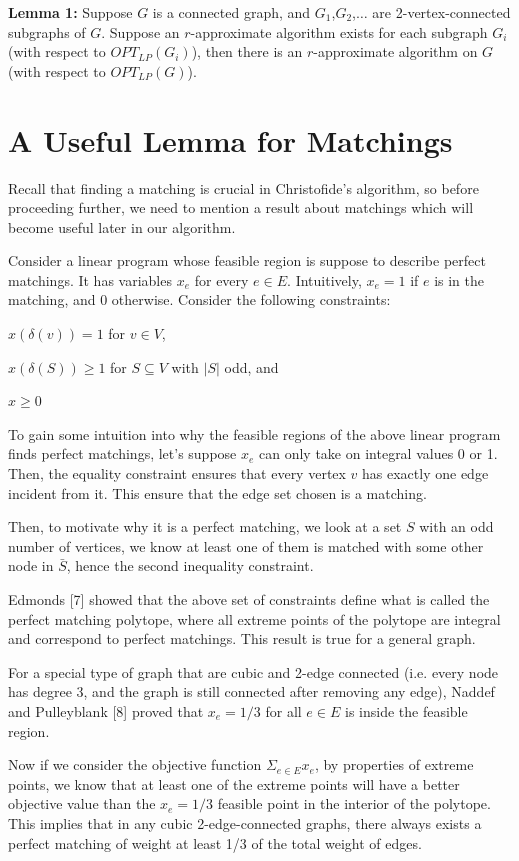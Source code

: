 \documentclass[12pt]{article}
\begin{document}
{\bf Lemma 1:} Suppose $G$ is a connected graph, and $G_1$,$G_2$,$\ldots$ are 2-vertex-connected subgraphs of $G$. Suppose an $r$-approximate algorithm exists for each subgraph $G_i$ (with respect to $OPT_{LP}(G_i)$), then there is an $r$-approximate algorithm on $G$ (with respect to $OPT_{LP}(G)$).

\section{A Useful Lemma for Matchings}

Recall that finding a matching is crucial in Christofide's algorithm, so before proceeding further, we need to mention a result about matchings which will become useful later in our algorithm.

Consider a linear program whose feasible region is suppose to describe perfect matchings. It has variables $x_e$ for every $e \in E$. Intuitively, $x_e = 1$ if $e$ is in the matching, and 0 otherwise. Consider the following constraints:

$x(\delta(v)) = 1$ for $v \in V$,

$x(\delta(S))\geq 1$ for $S \subseteq V$ with $|S|$ odd, and

$x \geq 0$

To gain some intuition into why the feasible regions of the above linear program finds perfect matchings, let's suppose $x_e$ can only take on integral values 0 or 1. Then, the equality constraint ensures that every vertex $v$ has exactly one edge incident from it. This ensure that the edge set chosen is a matching.

Then, to motivate why it is a perfect matching, we look at a set $S$ with an odd number of vertices, we know at least one of them is matched with some other node in $\bar{S}$, hence the second inequality constraint.

Edmonds [7] showed that the above set of constraints define what is called the perfect matching polytope, where all extreme points of the polytope are integral and correspond to perfect matchings. This result is true for a general graph.

For a special type of graph that are cubic and 2-edge connected (i.e. every node has degree 3, and the graph is still connected after removing any edge), Naddef and Pulleyblank [8] proved that $x_e = 1/3$ for all $e \in E$ is inside the feasible region.

Now if we consider the objective function $\Sigma_{e\in E}x_e$, by properties of extreme points, we know that at least one of the extreme points will have a better objective value than the $x_e = 1/3$ feasible point in the interior of the polytope. This implies that in any cubic 2-edge-connected graphs, there always exists a perfect matching of weight at least 1/3 of the total weight of edges.
\end{document}
